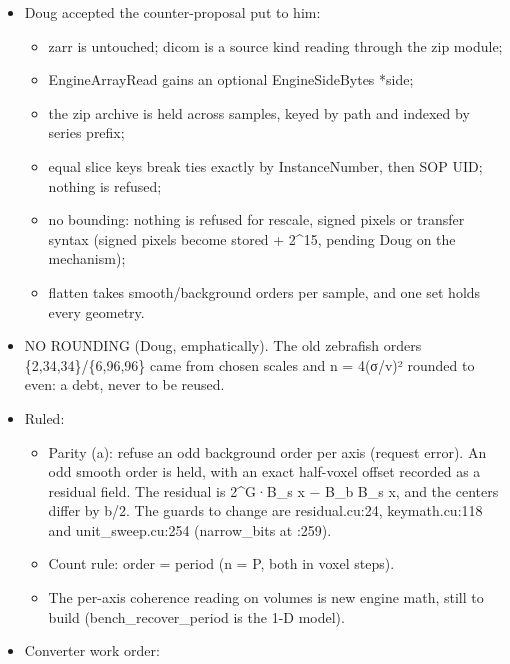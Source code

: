 \begin{itemize}
\begin{itemize}
\item sections in order of how often they're read (the file is read FIFO): head and geometry, then pixel offsets and stream, then deflated DICOM header bytes (which engine\_\allowbreak{}iapx\_\allowbreak{}load hands back), then the member list;
\item CRC-64 per part, with no zip CRC-32 rejoin.
\end{itemize}
\item Doug accepted the counter-proposal put to him:

\begin{itemize}
\item zarr is untouched; dicom is a source kind reading through the zip module;
\item EngineArrayRead gains an optional EngineSideBytes *side;
\item the zip archive is held across samples, keyed by path and indexed by series prefix;
\item equal slice keys break ties exactly by InstanceNumber, then SOP UID; nothing is refused;
\item no bounding: nothing is refused for rescale, signed pixels or transfer syntax (signed pixels become stored + 2\textasciicircum{}15, pending Doug on the mechanism);
\item flatten takes smooth/background orders per sample, and one set holds every geometry.
\end{itemize}
\item NO ROUNDING (Doug, emphatically). The old zebrafish orders \{2,34,34\}/\{6,96,96\} came from chosen scales and n = 4(σ/v)² rounded to even: a debt, never to be reused.
\item Ruled:

\begin{itemize}
\item Parity (a): refuse an odd background order per axis (request error). An odd smooth order is held, with an exact half-voxel offset recorded as a residual field. The residual is 2\textasciicircum{}G·B\_\allowbreak{}s x − B\_\allowbreak{}b B\_\allowbreak{}s x, and the centers differ by b/2. The guards to change are residual.cu:24, keymath.cu:118 and unit\_\allowbreak{}sweep.cu:254 (narrow\_\allowbreak{}bits at :259).
\item Count rule: order = period (n = P, both in voxel steps).
\item The per-axis coherence reading on volumes is new engine math, still to build (bench\_\allowbreak{}recover\_\allowbreak{}period is the 1-D model).
\end{itemize}
\item Converter work order:


\end{itemize}
